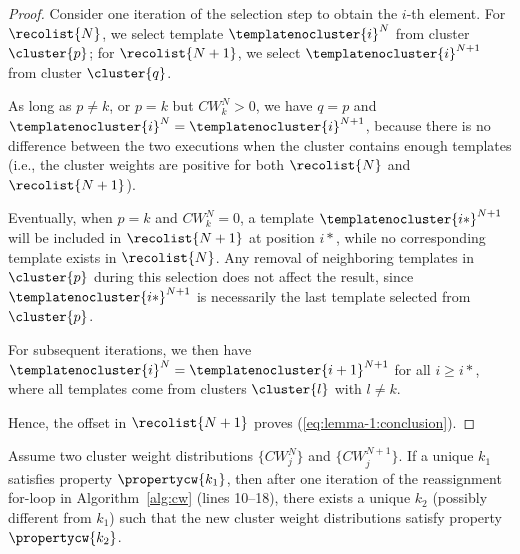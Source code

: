 \begin{proof}
Consider one iteration of the selection step to obtain the $i$-th element. For $\recolist{N}$, we select template $\templatenocluster{i}^{N}$ from cluster $\cluster{p}$; for $\recolist{N+1}$, we select $\templatenocluster{i}^{N+1}$ from cluster $\cluster{q}$.

As long as $p \neq k$, or $p = k$ but $CW_{k}^{N} > 0$, we have $q = p$ and $\templatenocluster{i}^{N} = \templatenocluster{i}^{N+1}$, because there is no difference between the two executions when the cluster contains enough templates (i.e., the cluster weights are positive for both $\recolist{N}$ and $\recolist{N+1}$). 

Eventually, when $p = k$ and $CW_{k}^{N} = 0$, a template $\templatenocluster{i*}^{N+1}$ will be included in $\recolist{N+1}$ at position $i*$, while no corresponding template exists in $\recolist{N}$. Any removal of neighboring templates in $\cluster{p}$ during this selection does not affect the result, since $\templatenocluster{i*}^{N+1}$ is necessarily the last template selected from $\cluster{p}$.

For subsequent iterations, we then have $\templatenocluster{i}^{N} = \templatenocluster{i+1}^{N+1}$ for all $i \ge i*$, where all templates come from clusters $\cluster{l}$ with $l \neq k$. 

Hence, the offset in $\recolist{N+1}$ proves (\ref{eq:lemma-1:conclusion}).
\end{proof}

\begin{lemma}\label{lemma:lemma-2}
Assume two cluster weight distributions $\{CW_j^{N}\}$ and $\{CW_j^{N+1}\}$. If a unique $k_1$ satisfies property $\propertycw{k_1}$, then after one iteration of the reassignment for-loop in Algorithm~\ref{alg:cw} (lines 10--18), there exists a unique $k_2$ (possibly different from $k_1$) such that the new cluster weight distributions satisfy property $\propertycw{k_2}$.
\end{lemma}

